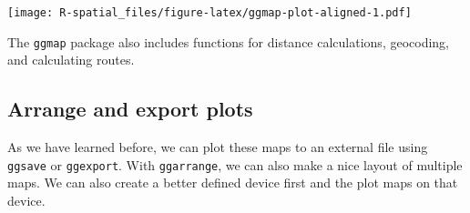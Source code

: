 \documentclass[
  11pt,
]{book}
\begin{document}
\texttt{[image: R-spatial\_files/figure-latex/ggmap-plot-aligned-1.pdf]}

The \texttt{ggmap} package also includes functions for distance calculations, geocoding, and calculating routes.

\hypertarget{arrange-and-export-plots}{%
\subsection{Arrange and export plots}\label{arrange-and-export-plots}}

As we have learned before, we can plot these maps to an external file using \texttt{ggsave} or \texttt{ggexport}. With \texttt{ggarrange}, we can also make a nice layout of multiple maps. We can also create a better defined device first and the plot maps on that device.
\end{document}
